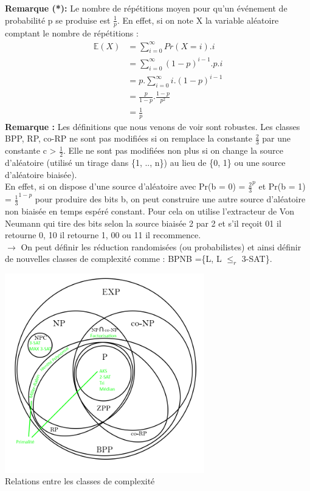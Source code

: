\documentclass[12pt,a4paper]{article}
\begin{document}
\textbf{Remarque (*):} Le nombre de répétitions moyen pour qu'un événement de probabilité p se produise est $\frac{1}{p}$. En effet, si on note X la variable aléatoire comptant le nombre de répétitions :
\begin{equation}
\begin{split}\nonumber
\mathbb{E}(X) &= \sum\limits_{i = 0}^{\infty}Pr(X = i).i\\
&= \sum\limits_{i = 0}^{\infty}	(1-p)^{i - 1}.p.i\\
&= p.\sum\limits_{i = 0}^{\infty}i.(1-p)^{i - 1}\\
&= \frac{p}{1 - p}.\frac{1 - p}{p^2}\\
&= \frac{1}{p}
\end{split}
\end{equation}
\textbf{Remarque :} Les définitions que nous venons de voir sont robustes. Les classes BPP, RP, co-RP ne sont pas modifiées si on remplace la constante $\frac{2}{3}$ par une constante c > $\frac{1}{2}$. Elle ne sont pas modifiées non plus si on change la source d'aléatoire (utilisé un tirage dans \{1, .., n\}) au lieu de \{0, 1\} ou une source d'aléatoire biaisée).\\
En effet, si on dispose d'une source d'aléatoire avec Pr(b = 0) = $\frac{2}{3}^p$ et Pr(b = 1) = $\frac{1}{3}^{1 - p}$ pour produire des bits b, on peut construire une autre source d'aléatoire non biaisée en temps espéré constant. Pour cela on utilise l'extracteur de Von Neumann qui tire des bits selon la source biaisée 2 par 2 et s'il reçoit 01 il retourne 0, 10 il retourne 1, 00 ou 11 il recommence.\\
$\longrightarrow$ On peut définir les réduction randomisées (ou probabilistes) et ainsi définir de nouvelles classes de complexité comme : BPNB =\{L, L $\leq_r$ 3-SAT\}.
\begin{center}
	\includegraphics[width=0.65\textwidth]{classes.png}\\
	Relations entre les classes de complexité
\end{center}
\end{document}
